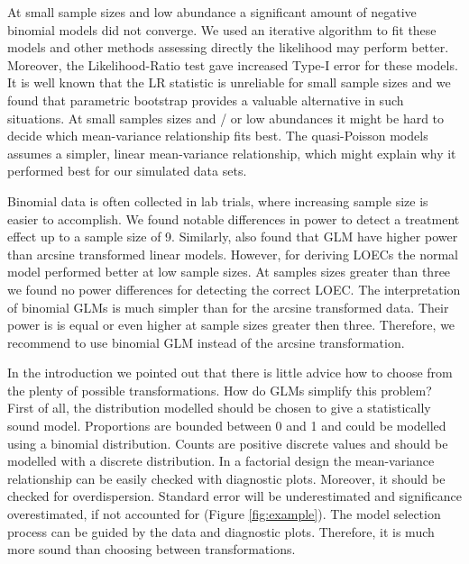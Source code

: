 \documentclass{scrartcl}
\begin{document}
At small sample sizes and low abundance a significant amount of negative binomial models did not converge.
We used an iterative algorithm to fit these models \citep{venables_modern_2002} and other methods assessing directly the likelihood may perform better.
Moreover, the Likelihood-Ratio test gave increased Type-I error for these models.
It is well known that the LR statistic is unreliable for small sample sizes \citep{bolker_generalized_2009,wilks_large-sample_1938} and we found that parametric bootstrap provides a valuable alternative in such situations.
At small samples sizes and / or low abundances it might be hard to decide which mean-variance relationship fits best.
The quasi-Poisson models assumes a simpler, linear mean-variance relationship, which might explain why it performed best for our simulated data sets. 


Binomial data is often collected in lab trials, where increasing sample size is easier to accomplish. 
We found notable differences in power to detect a treatment effect up to a sample size of 9.
Similarly, \citet{warton_arcsine_2011} also found that GLM have higher power than arcsine transformed linear models.
However, for deriving LOECs the normal model performed better at low sample sizes. At samples sizes greater than three we found no power differences for detecting the correct LOEC.
The interpretation of binomial GLMs is much simpler than for the arcsine transformed data.
Their power is is equal or even higher at sample sizes greater then three. 
Therefore, we recommend to use binomial GLM instead of the arcsine transformation.

In the introduction we pointed out that there is little advice how to choose from the plenty of possible transformations.
How do GLMs simplify this problem?
First of all, the distribution modelled should be chosen to give a statistically sound model.
Proportions are bounded between 0 and 1 and could be modelled using a binomial distribution.
Counts are positive discrete values and should be modelled with a discrete distribution.
In a factorial design the mean-variance relationship can be easily checked with diagnostic plots.
Moreover, it should be checked for overdispersion. 
Standard error will be underestimated and significance overestimated, if not accounted for (Figure \ref{fig:example}).
The model selection process can be guided by the data and diagnostic plots. Therefore, it is much more sound than choosing between transformations.
\end{document}
